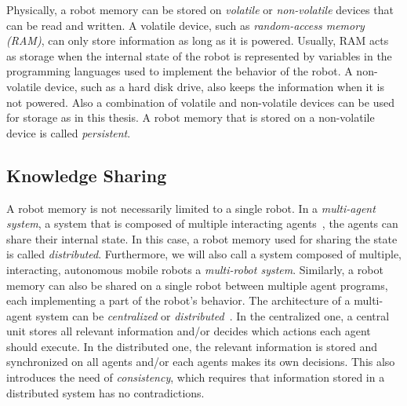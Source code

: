 Physically, a robot memory can be stored on \emph{volatile} or
\emph{non-volatile} devices that can be read and written. A volatile
device, such as \emph{random-access memory (RAM)}, can only store
information as long as it is powered. Usually, RAM acts as storage
when the internal state of the robot is represented by variables in
the programming languages used to implement the behavior of the
robot.  A non-volatile device, such as a hard disk drive, also keeps
the information when it is not powered. Also a combination of volatile
and non-volatile devices can be used for storage as in this thesis. A
robot memory that is stored on a non-volatile device is called
\emph{persistent}.

\subsection{Knowledge Sharing}
\label{sec:knowledge-sharing}
A robot memory is not necessarily limited to a single robot. In a
\emph{multi-agent system}, a system that is composed of multiple
interacting agents~\cite{multiagentsystems}, the agents can share
their internal state. In this case, a robot memory used for sharing
the state is called
\emph{distributed}. Furthermore, we will also call a system composed
of multiple, interacting, autonomous mobile robots a \emph{multi-robot
  system}. Similarly, a robot memory can also be shared on a single
robot between multiple agent programs, each implementing a part of
the robot's behavior. The architecture of a multi-agent system can be
\emph{centralized} or \emph{distributed}~\cite{RCLL-Planning}. In the centralized one,
a central unit stores all relevant information and/or decides which
actions each agent should execute. In the distributed one, the
relevant information is stored and synchronized on all agents and/or
each agents makes its own decisions. This also introduces the need of
\emph{consistency}, which requires that information stored in a
distributed system has no contradictions.

